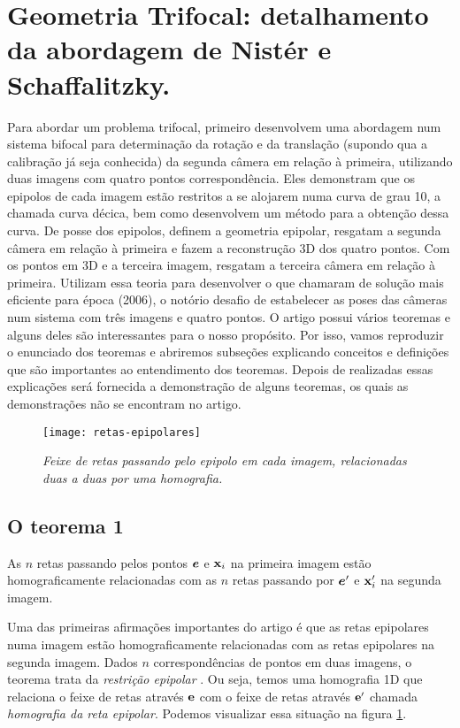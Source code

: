 \section{Geometria Trifocal: detalhamento da abordagem de Nistér e Schaffalitzky.}

Para abordar um problema trifocal, primeiro \cite{2503343} desenvolvem uma abordagem num sistema bifocal para determinação da rotação e da translação (supondo qua a calibração já seja conhecida) da segunda câmera em relação à primeira, utilizando duas imagens com quatro pontos correspondência. Eles demonstram que os epipolos de cada imagem estão restritos a se alojarem numa curva de grau 10, a chamada curva décica, bem como desenvolvem um método para a obtenção dessa curva. De posse dos epipolos, definem a geometria epipolar, resgatam a segunda câmera em relação à primeira e fazem a reconstrução 3D dos quatro pontos. Com os pontos em 3D e a terceira imagem, resgatam a terceira câmera em relação à primeira. Utilizam essa teoria para desenvolver o que chamaram de solução mais eficiente para época (2006), o notório desafio de estabelecer as poses das câmeras num sistema com três imagens e quatro pontos. O artigo possui vários teoremas e alguns deles são interessantes para o nosso propósito. Por isso, vamos reproduzir o enunciado dos teoremas e abriremos subseções explicando conceitos e definições que são importantes ao entendimento dos teoremas. Depois de realizadas essas explicações será fornecida a demonstração de alguns teoremas, os quais as demonstrações não se encontram no artigo.

\begin{figure}[!htb]
\centering
\texttt{[image: retas-epipolares]}
\caption{\textit{Feixe de retas passando pelo epipolo em cada imagem, relacionadas duas a duas por uma homografia.}}
\label{retas-epipolares}
\end{figure}

\subsection{O teorema 1}\label{sec.homografia-reta-epipolar} 


\begin{teorema}
As $n$ retas passando pelos pontos $\boldsymbol{e}$ e $\mathbf{x}_i$ na primeira imagem estão homograficamente relacionadas com as $n$ retas passando por $\boldsymbol{e}'$ e $\mathbf{x}'_i$ na segunda imagem.
\end{teorema}

Uma das primeiras afirmações importantes do artigo é que as retas epipolares numa  imagem estão homograficamente relacionadas com as retas epipolares na segunda imagem. Dados $n$ correspondências de pontos em duas imagens, o teorema trata da \textit{restrição epipolar} \citep{faugeras93three}. Ou seja, temos uma homografia 1D que relaciona o feixe de retas através ${\bf e}$ com o feixe de retas através ${\bf e'}$ chamada \textit{homografia da reta epipolar}. Podemos visualizar essa situação na figura \ref{retas-epipolares}.

